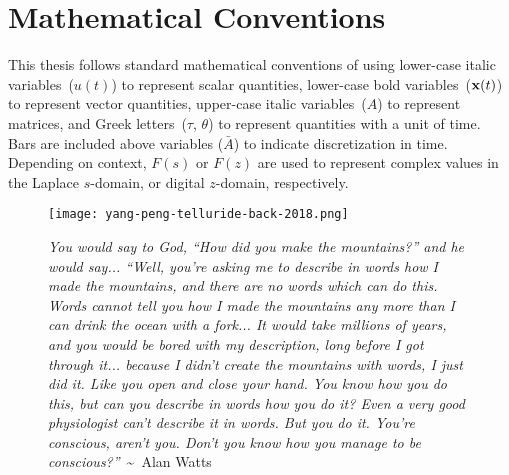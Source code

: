 \cleardoublepage
{}
\renewcommand\contentsname{Table of Contents}
\tableofcontents
\cleardoublepage
{}

\iffalse
\addcontentsline{toc}{chapter}{List of Todos}
\listoftodos
\cleardoublepage
\phantomsection
\fi

\listoftables
\cleardoublepage
{}

\listoffigures
\cleardoublepage
{}

\listoftheorems[ignoreall,show={theorem,lemma}]
\cleardoublepage
{}

\chapter*{Mathematical Conventions}
\label{typography}

This thesis follows standard mathematical conventions of using lower-case italic variables~($u(t)$) to represent scalar quantities, lower-case bold variables~($\mathbf{x}(t)$) to represent vector quantities, upper-case italic variables~($A$) to represent matrices, and Greek letters~($\tau$, $\theta$) to represent quantities with a unit of time.
Bars are included above variables ($\bar{A}$) to indicate discretization in time.
Depending on context, $F(s)$ or $F(z)$ are used to represent complex values in the Laplace $s$-domain, or digital $z$-domain, respectively.

\cleardoublepage
{}

\begin{figure}
\centering
\vspace*{\fill}
\begingroup
\texttt{[image: yang-peng-telluride-back-2018.png]}
\endgroup

\vspace{1em} 

\caption*{{\tiny \emph{You would say to God, ``How did you make the mountains?'' and he would say... ``Well, you're asking me to describe in words how I made the mountains, and there are no words which can do this. Words cannot tell you how I made the mountains any more than I can drink the ocean with a fork... It would take millions of years, and you would be bored with my description, long before I got through it... because I didn't create the mountains with words, I just did it. Like you open and close your hand. You know how you do this, but can you describe in words how you do it? Even a very good physiologist can't describe it in words. But you do it. You're conscious, aren't you. Don't you know how you manage to be conscious?''}~\textasciitilde~Alan Watts}}

\vspace*{\fill}
\end{figure}

\cleardoublepage
{}

